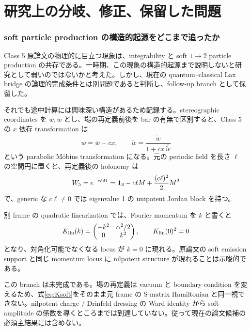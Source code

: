 \part{研究上の分岐、修正、保留した問題}

\section{soft particle production の構造的起源をどこまで追ったか}
Class 5 原論文の物理的に目立つ現象は、integrability と soft $1\to2$ particle production の共存である\cite{DFN2026}。一時期、この現象の構造的起源まで説明しないと研究として弱いのではないかと考えた。しかし、現在の quantum--classical Lax bridge の論理的完成条件とは別問題であると判断し、follow-up branch として保留した。

それでも途中計算には興味深い構造があるため記録する。stereographic coordinates を $w,\widetilde w$ とし、場の再定義前後を bar の有無で区別すると、Class 5 の $x$ 依存 transformation は
\begin{equation}
w=\overline w-cx,
\qquad
\widetilde w=\frac{\overline{\widetilde w}}{1+cx\,\overline{\widetilde w}}
\label{eq:Mobius}
\end{equation}
という parabolic M\"obius transformation になる。元の periodic field を長さ $\ell$ の空間円に置くと、再定義後の holonomy は
\begin{equation}
W_5=e^{-c\ell M}=\mathbf 1_{3}-c\ell M+\frac{(c\ell)^2}{2}M^2
\label{eq:W5}
\end{equation}
で、generic な $c\ell\neq0$ では eigenvalue 1 の unipotent Jordan block を持つ。

別 frame の quadratic linearization では、Fourier momentum を $k$ と書くと
\begin{equation}
K_{\rm lin}(k)=\begin{pmatrix}-k^2&\alpha^2/2\\0&k^2\end{pmatrix},
\qquad
K_{\rm lin}(0)^2=0
\label{eq:Ksoft}
\end{equation}
となり、対角化可能でなくなる locus が $k=0$ に現れる。原論文の soft emission support と同じ momentum locus に nilpotent structure が現れることは示唆的である。

\begin{cautionnote}
この branch は未完成である。場の再定義は vacuum と boundary condition を変えるため、式\eqref{eq:Ksoft}をそのまま元 frame の S-matrix Hamiltonian と同一視できない。nilpotent charge / Drinfeld dressing の Ward identity から soft amplitude の係数を導くところまでは到達していない。従って現在の論文候補の必須主結果には含めない。
\end{cautionnote}

